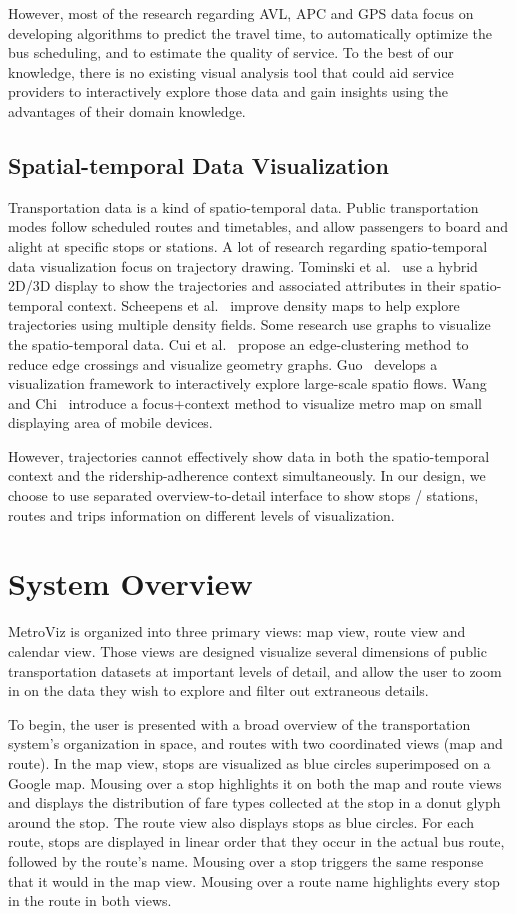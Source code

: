 \documentclass[journal]{vgtc}                %
\begin{document}
However, most of the research regarding AVL, APC and GPS data focus on developing algorithms to predict the travel time, to automatically optimize the bus scheduling, and to estimate the quality of service. To the best of our knowledge, there is no existing visual analysis tool that could aid service providers to interactively explore those data and gain insights using the advantages of their domain knowledge.

\subsection{Spatial-temporal Data Visualization}
Transportation data is a kind of spatio-temporal data. Public transportation modes follow scheduled routes and timetables, and allow passengers to board and alight at specific stops or stations. A lot of research regarding spatio-temporal data visualization focus on trajectory drawing. 
Tominski et al.~\cite{Tominski2012} use a hybrid 2D/3D display to show the trajectories and associated attributes in their spatio-temporal context.
Scheepens et al.~\cite{6065019} improve density maps to help explore trajectories using multiple density fields.
Some research use graphs to visualize the spatio-temporal data.
Cui et al.~\cite{4658140} propose an edge-clustering method to reduce edge crossings and visualize geometry graphs.
Guo~\cite{5290710} develops a visualization framework to interactively explore large-scale spatio flows.
Wang and Chi~\cite{6065020} introduce a focus+context method to visualize metro map on small displaying area of mobile devices.

However, trajectories cannot effectively show data in both the spatio-temporal context and the ridership-adherence context simultaneously. In our design, we choose to use separated overview-to-detail interface to show stops / stations, routes and trips information on different levels of visualization.

\section{System Overview}
MetroViz is organized into three primary views: map view, route view and calendar view. Those views are designed visualize several dimensions of public transportation datasets at important levels of detail, and allow the user to zoom in on the data they wish to explore and filter out extraneous details.

To begin, the user is presented with a broad overview of the transportation system's organization in space, and routes with two coordinated views (map and route). In the map view, stops are visualized as blue circles superimposed on a Google map. Mousing over a stop highlights it on both the map and route views and displays the distribution of fare types collected at the stop in a donut glyph around the stop. The route view also displays stops as blue circles. For each route, stops are displayed in linear order that they occur in the actual bus route, followed by the route's name. Mousing over a stop triggers the same response that it would in the map view. Mousing over a route name highlights every stop in the route in both views.
\end{document}
